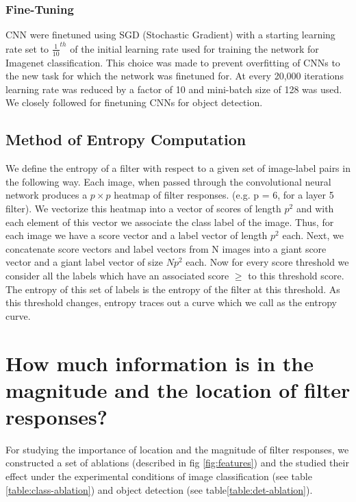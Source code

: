 \documentclass[runningheads]{llncs}
\begin{document}
\subsubsection{Fine-Tuning}
\label{sub:fine-train}
CNN were finetuned using SGD (Stochastic Gradient) with a starting learning rate set to $\frac{1}{10}^{th}$ of the initial learning rate used for training the network for Imagenet classification. This choice was made to prevent overfitting of CNNs to the new task for which the network was finetuned for. At every 20,000 iterations learning rate was reduced by a factor of 10 and mini-batch size of 128 was used. We closely followed \cite{Rcnn} for finetuning CNNs for object detection. 

\subsection{Method of Entropy Computation}
\label{sub:def-ent}
We define the entropy of a filter with respect to a given set of image-label pairs in the following way. Each image, when passed through the convolutional neural network produces a $p \times p$ heatmap of filter responses. (e.g. p = 6, for a layer 5 filter). We vectorize this heatmap into a vector of scores of length $p^2$ and with each element of this vector we associate the class label of the image. Thus, for each image we have a score vector and a label vector of length $p^2$ each. Next, we concatenate score vectors and label vectors from N images into a giant score vector and a giant label vector  of size $Np^2$ each. Now for every score threshold we consider all the labels which have an associated score $\geq$ to this threshold score. The entropy of this set of labels is the entropy of the filter at this threshold. As this threshold changes, entropy traces out a curve which we call as the entropy curve.  


\section{How much information is in the magnitude and the location of filter responses?}
\label{sec-where-info}
For studying the importance of location and the magnitude of filter responses, we constructed a set of ablations (described in fig \ref{fig:features}) and the studied their effect under the experimental conditions of image classification (see table \ref{table:class-ablation}) and object detection (see table\ref{table:det-ablation}).
\end{document}
